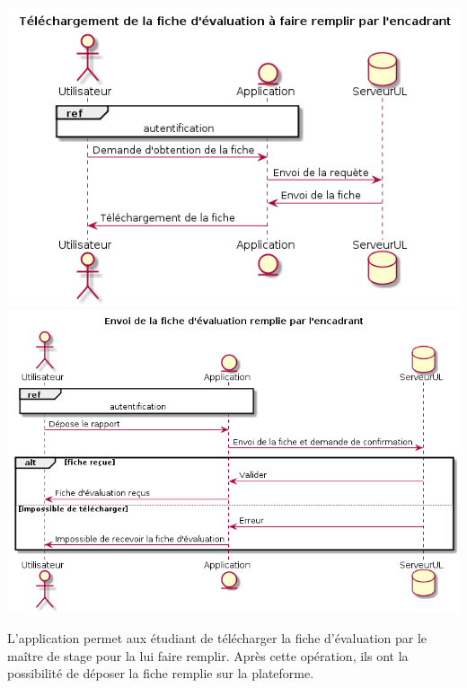 \documentclass{scrreprt}
\begin{document}
\begin{center}
	\includegraphics[scale=0.55]{image/telechargementFicheEvaluation.png}
	\includegraphics[scale=0.55]{image/envoiFicheEvaluation.png}
\end{center}
\hspace{1cm}L'application permet aux étudiant de télécharger la fiche d'évaluation par le maître de stage pour la lui faire remplir. Après cette opération, ils ont la possibilité de déposer la fiche remplie sur la plateforme.
\end{document}
